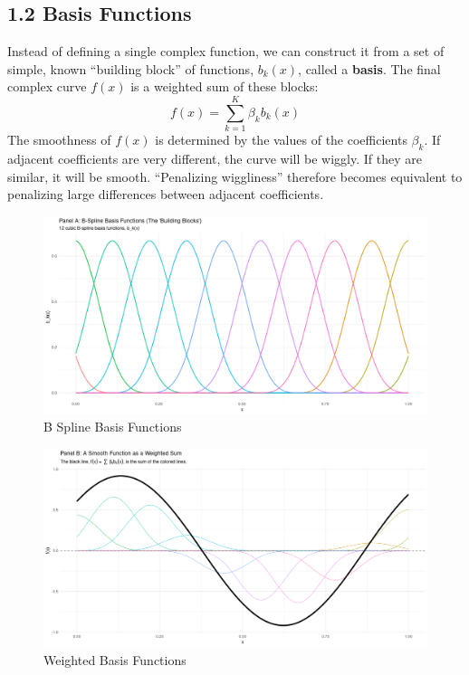 \documentclass[11pt, a4paper]{article}
\begin{document}
\subsection{1.2 Basis Functions}
Instead of defining a single complex function, we can construct it from a set of simple, known ``building block'' of functions, $b_k(x)$, called a \textbf{basis}. The final complex curve $f(x)$ is a weighted sum of these blocks:
\[ f(x) = \sum_{k=1}^{K} \beta_k b_k(x) \]
The smoothness of $f(x)$ is determined by the values of the coefficients $\beta_k$. If adjacent coefficients are very different, the curve will be wiggly. If they are similar, it will be smooth. ``Penalizing wiggliness'' therefore becomes equivalent to penalizing large differences between adjacent coefficients.
\begin{figure}[h!]
 \centering
 \includegraphics[width=\linewidth]{b-splines.png}
 \caption{B Spline Basis Functions}
 \label{fig:enter-label-1}
\end{figure}

\begin{figure}[h!]
 \centering
 \includegraphics[width=1\linewidth]{weighted.png}
 \caption{Weighted Basis Functions}
 \label{fig:enter-label-2}
\end{figure}
\end{document}
